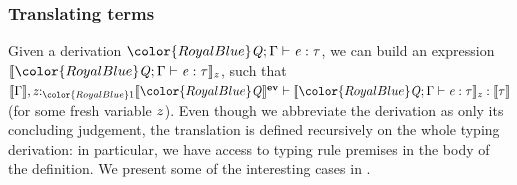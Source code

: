 \documentclass[acmsmall,usenames,dvipsnames,natbib=false,acmthm=false,screen]{acmart}
\newcommand{\constraintcolour}{\color{RoyalBlue}}
\newcommand{\constraintfont}[1]{{\constraintcolour#1}}
\newcommand{\multiplicitycolour}{\color{RoyalBlue}}
\newcommand{\multiplicityfont}[1]{{\multiplicitycolour#1}}
\newcommand{\dsterm}[2]{\llbracket #2 \rrbracket_{#1}}
\newcommand{\dstype}[1]{\llbracket #1 \rrbracket}
\newcommand{\dsevidence}[1]{\llbracket #1 \rrbracket^{\mathbf{ev}}}
\theoremstyle{acmplain}
\theoremstyle{acmdefinition}
\begin{document}
\subsubsection{Translating terms}
Given a derivation $ \constraintfont{ \ottnt{Q} }   \ottsym{;}  \Gamma  \vdash  \ottnt{e}  \ottsym{:}  \tau$, we can build an expression
$ \dsterm{ \ottmv{z} }{  \constraintfont{ \ottnt{Q} }   \ottsym{;}  \Gamma  \vdash  \ottnt{e}  \ottsym{:}  \tau } $, such that
$ \dstype{ \Gamma }   \ottsym{,}   \ottmv{z} {:}_{  \multiplicityfont{ \ottsym{1} }  }  \dsevidence{\constraintfont{ \ottnt{Q} } }    \vdash   \dsterm{ \ottmv{z} }{  \constraintfont{ \ottnt{Q} }   \ottsym{;}  \Gamma  \vdash  \ottnt{e}  \ottsym{:}  \tau }   \ottsym{:}   \dstype{ \tau } $ (for some fresh variable
$ \mathit{z} $). Even though we abbreviate the derivation as only its
concluding judgement, the translation is defined recursively on the
whole typing derivation: in particular, we have access to typing rule
premises in the body of the definition.
%
We present some of the interesting cases in .
\end{document}
